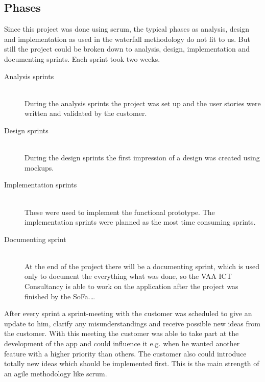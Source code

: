 \subsection{Phases}
Since this project was done using scrum, the typical phases as analysis, design and implementation as used in the waterfall methodology do not fit to us. But still the project could be broken down to analysis, design, implementation and documenting sprints. Each sprint took two weeks. 
\begin{description}
	\item[Analysis sprints] \hfill \\
	During the analysis sprints the project was set up and the user stories were written and validated by the customer. 
	\item[Design sprints] \hfill \\
	During the design sprints the first impression of a design was created using mockups. 
	\item[Implementation sprints] \hfill \\
	These were used to implement the functional prototype. The implementation sprints were planned as the most time consuming sprints.
	\item[Documenting sprint] \hfill \\
	At the end of the project there will be a documenting sprint, which is used only to document the everything what was done, so the VAA ICT Consultancy is able to work on the application after the project was finished by the SoFa.\ldots
\end{description}

After every sprint a sprint-meeting with the customer was scheduled to give an update to him, clarify any misunderstandings and receive possible new ideas from the customer. With this meeting the customer was able to take part at the development of the \gls{app} and could influence it e.g. when he wanted another feature with a higher priority than others. The customer also could introduce totally new ideas which should be implemented first. This is the main strength of an agile methodology like scrum.